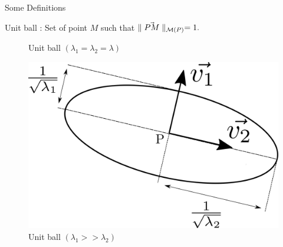 \begin{frame}{Some Definitions}
{\begin{block}{Unit ball : Set of point $M$ such that $\parallel \vec{PM} \parallel_{\mathcal{M}(P)} = 1.$}
\begin{multicols}{2}
\begin{figure}[!htbp]
\vspace{0.2cm}
\caption{\tiny{Unit ball $(\lambda_1 = \lambda_2 = \lambda)$}}
\label{ellipse_iso_triangle}
\end{figure}
            \columnbreak
           \begin{figure}[!htbp]
\centering
\includegraphics[scale=0.028]{image/ellipse_aniso.pdf}
\vspace{-0.3cm}
\caption{\tiny{Unit ball $(\lambda_1 >> \lambda_2)$}}
\label{ellipse_iso_triangle}
     \end{figure}
 \end{multicols}
  \end{block}
  }
\end{frame}





